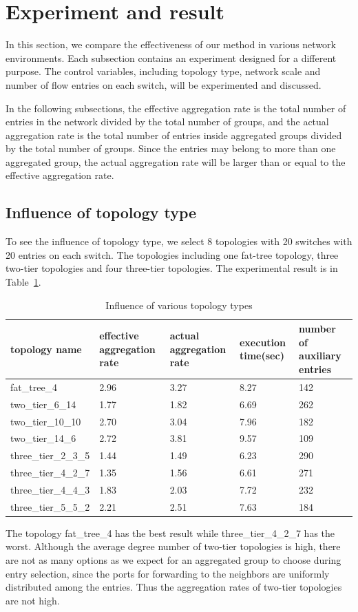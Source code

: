 \documentclass[conference]{IEEEtran}
\begin{document}
\section{Experiment and result}
\label{sec:experiment}
In this section, we compare the effectiveness of our method in various network environments. Each subsection contains an experiment designed for a different purpose. The control variables, including topology type, network scale and number of flow entries on each switch, will be experimented and discussed. 

In the following subsections, the effective aggregation rate is the total number of entries in the network divided by the total number of groups, and the actual aggregation rate is the total number of entries inside aggregated groups divided by the total number of groups. Since the entries may belong to more than one aggregated group, the actual aggregation rate will be larger than or equal to the effective aggregation rate. 

\subsection{Influence of topology type}
To see the influence of topology type, we select 8 topologies with 20 switches with 20 entries on each switch. The topologies including one fat-tree topology, three two-tier topologies and four three-tier topologies. The experimental result is in Table~\ref{table:different_topo_type}. 

\begin{table}
\centering
\caption{Influence of various topology types}
\begin{tabular}{|p{1.8cm}|p{1.4cm}|p{1.3cm}|p{1.1cm}|p{1.3cm}|}
\hline topology name & effective aggregation rate & actual aggregation rate & execution time(sec) & number of auxiliary entries \\
\hline
\hline fat\_tree\_4 & 2.96 & 3.27 & 8.27 & 142 \\
\hline two\_tier\_6\_14 & 1.77 & 1.82 & 6.69 & 262 \\ 
\hline two\_tier\_10\_10 & 2.70 & 3.04 & 7.96 & 182 \\
\hline two\_tier\_14\_6 & 2.72 & 3.81 & 9.57 & 109 \\ 
\hline three\_tier\_2\_3\_5 & 1.44 & 1.49 & 6.23 & 290 \\
\hline three\_tier\_4\_2\_7 & 1.35 & 1.56 & 6.61 & 271 \\
\hline three\_tier\_4\_4\_3 & 1.83 & 2.03 & 7.72 & 232 \\
\hline three\_tier\_5\_5\_2 & 2.21 & 2.51 & 7.63 & 184 \\
\hline
\end{tabular}
\label{table:different_topo_type}
\end{table}
The topology fat\_tree\_4 has the best result while three\_tier\_4\_2\_7 has the worst. Although the average degree number of two-tier topologies is high, there are not as many options as we expect for an aggregated group to choose during entry selection, since the ports for forwarding to the neighbors are uniformly distributed among the entries. Thus the aggregation rates of two-tier topologies are not high.
\end{document}
